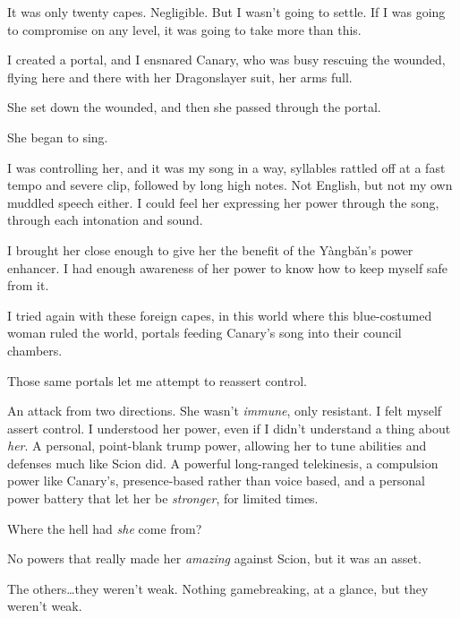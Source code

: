 It was only twenty capes.  Negligible.  But I wasn't going to settle.  If I was going to compromise on any level, it was going to take more than this.



I created a portal, and I ensnared Canary, who was busy rescuing the wounded, flying here and there with her Dragonslayer suit, her arms full.



She set down the wounded, and then she passed through the portal.



She began to sing.



I was controlling her, and it was my song in a way, syllables rattled off at a fast tempo and severe clip, followed by long high notes.  Not English, but not my own muddled speech either.  I could feel her expressing her power through the song, through each intonation and sound.



I brought her close enough to give her the benefit of the Y\`{a}ngb\v{a}n's power enhancer.  I had enough awareness of her power to know how to keep myself safe from it.



I tried again with these foreign capes, in this world where this blue-costumed woman ruled the world, portals feeding Canary's song into their council chambers.



Those same portals let me attempt to reassert control.



An attack from two directions.  She wasn't \emph{immune}, only resistant.  I felt myself assert control.  I understood her power, even if I didn't understand a thing about \emph{her}.  A personal, point-blank trump power, allowing her to tune abilities and defenses much like Scion did.  A powerful long-ranged telekinesis, a compulsion power like Canary's, presence-based rather than voice based, and a personal power battery that let her be \emph{stronger}, for limited times.



Where the hell had \emph{she} come from?



No powers that really made her \emph{amazing} against Scion, but it was an asset.



The others\ldots they weren't weak.  Nothing gamebreaking, at a glance, but they weren't weak.




